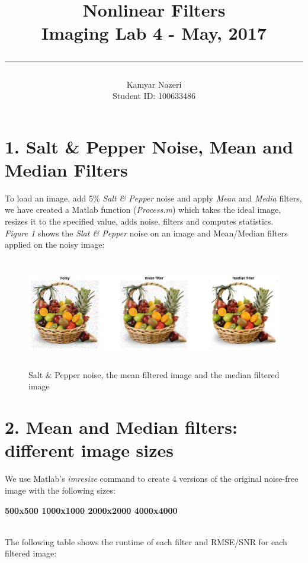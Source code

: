 \documentclass[a4paper,11pt]{article}
\newcommand\tab[1][4mm]{\hspace*{#1}}
\begin{document}
\title{
	\Huge \textbf {Nonlinear Filters}
    \\ [0.2cm]
	\LARGE Imaging Lab 4 - May, 2017
    \\ [0.5cm]
    \hrule
}

\date{}

\author{
		\Large Kamyar Nazeri \\
		\large Student ID: 100633486 }

\maketitle
\newpage

\section*{1. Salt \& Pepper Noise, Mean and Median Filters}
To load an image, add 5\% \emph{Salt \& Pepper} noise and apply \emph{Mean} and \emph{Media} filters, we have created a Matlab function (\emph{Process.m}) which takes the ideal image, resizes it to the specified value, adds noise, filters and computes statistics. \\
\emph{Figure 1} shows the \emph{Slat \& Pepper} noise on an image and Mean/Median filters applied on the noisy image:

\begin{figure}[!htb]
  \centering
  \includegraphics[width=16cm, height=4.8cm]{1.png}
  \caption{\small Salt \& Pepper noise, the mean filtered image and the median filtered image}
\end{figure}

\section*{2. Mean and Median filters: different image sizes}
We use Matlab's \emph{imresize} command to create 4 versions of the original noise-free image with the following sizes: \\
\begin{center}\Large
\textbf{500x500 \tab 1000x1000 \tab 2000x2000 \tab 4000x4000}
\end{center}
 \\The following table shows the runtime of each filter and RMSE/SNR for each filtered image:
\end{document}
